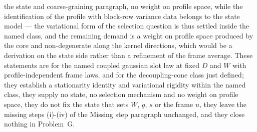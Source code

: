 the state and coarse-graining paragraph, no weight on profile space, while the identification of the profile with block-row variance data belongs to the state model — the variational form of the selection question is thus settled inside the named class, and the remaining demand is a weight on profile space produced by the core and non-degenerate along the kernel directions, which would be a derivation on the state side rather than a refinement of the frame average. These statements are for the named coupled gaussian slot law at fixed \(D\) and \(W\) with profile-independent frame laws, and for the decoupling-cone class just defined; they establish a stationarity identity and variational rigidity within the named class, they supply no state, no selection mechanism and no weight on profile space, they do not fix the state that sets \(W\), \(g\), \(s\) or the frame \(u\), they leave the missing steps (i)-(iv) of the Missing step paragraph unchanged, and they close nothing in Problem~G.


